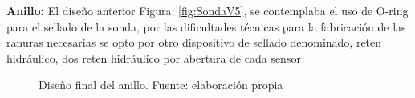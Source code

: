 \begin{appendices}
\textbf{Anillo: }
El diseño anterior Figura: \ref{fig:SondaV5}, se contemplaba el uso de O-ring para el sellado de la sonda, por las dificultades t\'ecnicas para la fabricaci\'on de las ranuras necesarias se opto por otro dispositivo de sellado denominado,  reten hidr\'aulico, dos reten hidr\'aulico por abertura de cada sensor
\\
\begin{figure}[h]
\centering
{}
\caption{Dise\~no final del anillo. Fuente: elaboración propia}
\label{fig:Anillo2019}
\end{figure}


\end{appendices}
